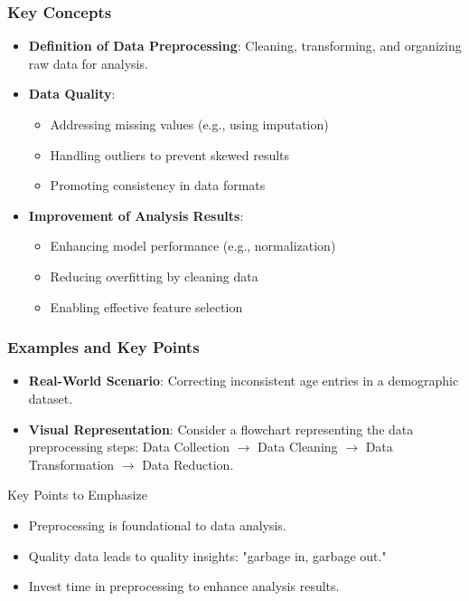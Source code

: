\documentclass[aspectratio=169]{beamer}
\begin{document}
\begin{frame}[fragile]
  \frametitle{Key Concepts}
  \begin{itemize}
    \item \textbf{Definition of Data Preprocessing}: Cleaning, transforming, and organizing raw data for analysis.
    \item \textbf{Data Quality}: 
      \begin{itemize}
        \item Addressing missing values (e.g., using imputation)
        \item Handling outliers to prevent skewed results
        \item Promoting consistency in data formats
      \end{itemize}
    \item \textbf{Improvement of Analysis Results}: 
      \begin{itemize}
        \item Enhancing model performance (e.g., normalization)
        \item Reducing overfitting by cleaning data
        \item Enabling effective feature selection
      \end{itemize}
  \end{itemize}
\end{frame}

\begin{frame}[fragile]
  \frametitle{Examples and Key Points}
  \begin{itemize}
    \item \textbf{Real-World Scenario}: Correcting inconsistent age entries in a demographic dataset.
    \item \textbf{Visual Representation}: Consider a flowchart representing the data preprocessing steps: 
      Data Collection $\rightarrow$ Data Cleaning $\rightarrow$ Data Transformation $\rightarrow$ Data Reduction.
  \end{itemize}
  
  \begin{block}{Key Points to Emphasize}
    \begin{itemize}
      \item Preprocessing is foundational to data analysis.
      \item Quality data leads to quality insights: "garbage in, garbage out."
      \item Invest time in preprocessing to enhance analysis results.
    \end{itemize}
  \end{block}
\end{frame}
\end{document}
